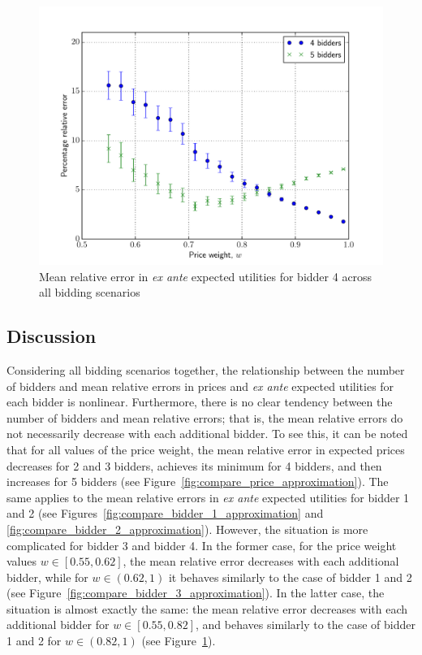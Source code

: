 \begin{figure}[t!]
  \includegraphics[width=\figsize]{Approximation/Figures/compare_bidder_4}
  \caption{Mean relative error in \emph{ex ante} expected utilities for bidder 4 across all bidding scenarios}
  \label{fig:compare_bidder_4_approximation}
\end{figure}

\subsection{Discussion} %
\label{sub:discussion_approximation}
Considering all bidding scenarios together, the relationship between the number of bidders and mean relative errors in prices and \emph{ex ante} expected utilities for each bidder is nonlinear. Furthermore, there is no clear tendency between the number of bidders and mean relative errors; that is, the mean relative errors do not necessarily decrease with each additional bidder. To see this, it can be noted that for all values of the price weight, the mean relative error in expected prices decreases for 2 and 3 bidders, achieves its minimum for 4 bidders, and then increases for 5 bidders (see Figure~\ref{fig:compare_price_approximation}). The same applies to the mean relative errors in \emph{ex ante} expected utilities for bidder 1 and 2 (see Figures~\ref{fig:compare_bidder_1_approximation} and \ref{fig:compare_bidder_2_approximation}). However, the situation is more complicated for bidder 3 and bidder 4. In the former case, for the price weight values $w\in[0.55, 0.62]$, the mean relative error decreases with each additional bidder, while for $w\in(0.62, 1)$ it behaves similarly to the case of bidder 1 and 2 (see Figure~\ref{fig:compare_bidder_3_approximation}). In the latter case, the situation is almost exactly the same: the mean relative error decreases with each additional bidder for $w\in[0.55, 0.82]$, and behaves similarly to the case of bidder 1 and 2 for $w\in(0.82, 1)$ (see Figure~\ref{fig:compare_bidder_4_approximation}).

